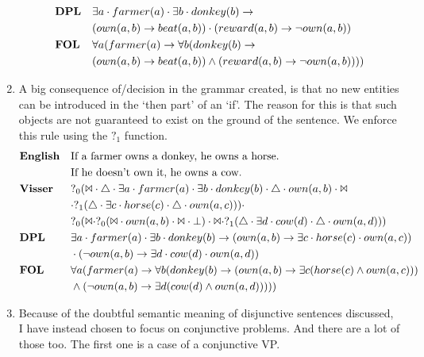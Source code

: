 \documentclass[12pt]{article}
\begin{document}
\begin{enumerate}
\begin{align*}
&\text{\textbf{DPL}}&&\exists a \cdot farmer(a) \cdot \exists b \cdot donkey(b) \rightarrow\\&&& (own(a,b) \rightarrow beat(a,b))\cdot (reward(a,b) \rightarrow \neg own(a,b)) \\
&\text{\textbf{FOL}}&&\forall a(farmer(a) \rightarrow \forall b(donkey(b) \rightarrow\\&&& (own(a,b) \rightarrow beat(a,b))\wedge (reward(a,b) \rightarrow \neg own(a,b)))) \\
\end{align*}
\item
A big consequence of/decision in the grammar created, is that no new entities can be introduced in the `then part' of an `if'. The reason for this is that such objects are not guaranteed to exist on the ground of the sentence. We enforce this rule using the $?_1$ function.
\begin{align*}
&\text{\textbf{English}}&&\text{If a farmer owns a donkey, he owns a horse.}\\&&&\text{If he doesn't own it, he owns a cow.} \\
&\text{\textbf{Visser}}&&?_0(\Bowtie \cdot \triangle \cdot \exists a \cdot farmer(a) \cdot \exists b \cdot donkey(b) \cdot \triangle \cdot own(a,b) \cdot \Bowtie\\&&&\cdot ?_1(\triangle \cdot \exists c \cdot horse(c) \cdot \triangle \cdot own(a,c))) \cdot\\&&& ?_0(\Bowtie\cdot ?_0(\Bowtie \cdot own(a,b) \cdot \Bowtie \cdot \bot) \cdot \Bowtie \cdot ?_1(\triangle \cdot \exists d \cdot cow(d) \cdot \triangle \cdot own(a,d))) \\
&\text{\textbf{DPL}}&&\exists a \cdot farmer(a) \cdot \exists b \cdot donkey(b) \rightarrow (own(a,b) \rightarrow \exists c \cdot horse(c) \cdot own(a,c))\\&&& \cdot (\neg own(a,b) \rightarrow \exists d \cdot cow(d) \cdot own(a,d)) \\
&\text{\textbf{FOL}}&&\forall a(farmer(a) \rightarrow \forall b(donkey(b) \rightarrow (own(a,b) \rightarrow \exists c(horse(c) \wedge own(a,c)))\\&&&\wedge (\neg own(a,b) \rightarrow \exists d(cow(d) \wedge own(a,d))))) \\
\end{align*}
\item
Because of the doubtful semantic meaning of disjunctive sentences discussed, I have instead chosen to focus on conjunctive problems. And there are a lot of those too. The first one is a case of a conjunctive VP.

\end{enumerate}
\end{document}

